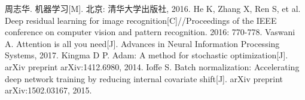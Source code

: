 {}
\begin{thebibliography}{100}

周志华. 机器学习[M]. 北京: 清华大学出版社, 2016.
He K, Zhang X, Ren S, et al. Deep residual learning for image recognition[C]//Proceedings of the IEEE conference on computer vision and pattern recognition. 2016: 770-778.
Vaswani A. Attention is all you need[J]. Advances in Neural Information Processing Systems, 2017.
Kingma D P. Adam: A method for stochastic optimization[J]. arXiv preprint arXiv:1412.6980, 2014.
Ioffe S. Batch normalization: Accelerating deep network training by reducing internal covariate shift[J]. arXiv preprint arXiv:1502.03167, 2015.

\end{thebibliography}
